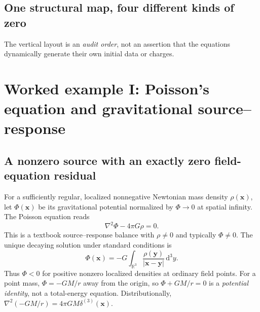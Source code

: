 \documentclass[11pt,a4paper]{article}
\newcommand{\R}{\mathbb{R}}
\newcommand{\dd}{\mathrm{d}}
\newcommand{\cZ}{\mathfrak Z}
\newcommand{\cG}{\mathcal G}
\theoremstyle{tmon}
\theoremstyle{definition}
\begin{document}
\subsection{One structural map, four different kinds of zero}
\begin{center}
\end{center}
The vertical layout is an \emph{audit order}, not an assertion that the equations dynamically generate their own initial data or charges.

\section{Worked example I: Poisson's equation and gravitational source--response}
\subsection{A nonzero source with an exactly zero field-equation residual}
For a sufficiently regular, localized nonnegative Newtonian mass density $\rho(\bm x)$, let $\Phi(\bm x)$ be its gravitational potential normalized by $\Phi\to0$ at spatial infinity. The Poisson equation reads
\begin{equation}\label{eq:poisson}
\boxed{\nabla^2\Phi-4\pi G\rho=0.}
\end{equation}
This is a textbook source--response balance with $\rho\neq0$ and typically $\Phi\neq0$. The unique decaying solution under standard conditions is
\begin{equation}\label{eq:Green}
\Phi(\bm x)=-G\int_{\R^3}\frac{\rho(\bm y)}{|\bm x-\bm y|}\,\dd^3y.
\end{equation}
Thus $\Phi<0$ for positive nonzero localized densities at ordinary field points. For a point mass, $\Phi=-GM/r$ away from the origin, so $\Phi+GM/r=0$ is a \emph{potential identity}, not a total-energy equation. Distributionally, $\nabla^2(-GM/r)=4\pi GM\delta^{(3)}(\bm x)$.
\end{document}
